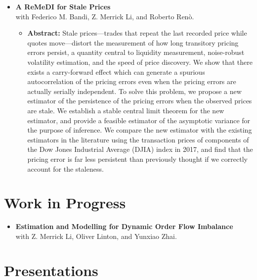 \documentclass[12pt,a4paper]{article}
\begin{document}
\begin{itemize}
    \item \textbf{A ReMeDI for Stale Prices}\\[0.3em]
    with Federico M. Bandi, Z. Merrick Li, and Roberto Ren\`o.
    \begin{itemize}[label=$\circ$, leftmargin=2.2em, itemsep=0.6em, topsep=0.3em]
        \item \textbf{Abstract:} Stale prices---trades that repeat the last recorded price while quotes
        move---distort the measurement of how long transitory pricing errors
        persist, a quantity central to liquidity measurement, noise-robust
        volatility estimation, and the speed of price discovery. 
        We show that there exists a carry-forward effect which can generate a 
        spurious autocorrelation of the pricing errors even when the pricing errors 
        are actually serially independent. 
        To solve this problem, we propose a new estimator of 
        the persistence of the pricing errors when the observed prices 
        are stale. We establish a stable central limit theorem for the new estimator, 
        and provide a feasible estimator of the asymptotic variance for the purpose of inference. 
        We compare the new estimator with the existing estimators in the literature using 
        the transaction prices of components of the Dow Jones Industrial Average (DJIA) 
        index in 2017, and find that the pricing error is far less persistent 
        than previously thought if we correctly account for the staleness. 
    \end{itemize}
    
\end{itemize}

\section{Work in Progress}
\begin{itemize}
    \item \textbf{Estimation and Modelling for Dynamic Order Flow Imbalance}\\[0.3em]
    with Z. Merrick Li, Oliver Linton, and Yunxiao Zhai.
\end{itemize}

\section{Presentations}
\end{document}
